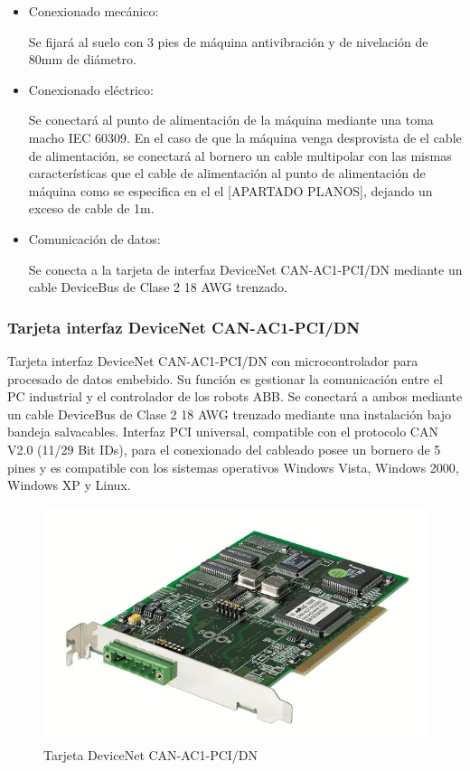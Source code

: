 		\begin{itemize}
				\item{Conexionado mecánico:}
				
				Se fijará al suelo con 3 pies de máquina antivibración y de nivelación de 80mm de diámetro.

				\item{Conexionado eléctrico:}

				Se conectará al punto de alimentación de la máquina mediante una  toma macho IEC 60309. En el caso de que la máquina venga desprovista de el cable de alimentación, se conectará al bornero un cable multipolar con las mismas características que el cable de alimentación al punto de alimentación de máquina como se especifica en el el [APARTADO PLANOS], dejando un exceso de cable de 1m. \	
							
				\item{Comunicación de datos:}

				Se conecta a la tarjeta de interfaz DeviceNet CAN-AC1-PCI/DN mediante un cable DeviceBus de Clase 2 18 AWG trenzado.
		\end{itemize}
\newpage

	\subsubsection{Tarjeta interfaz DeviceNet CAN-AC1-PCI/DN}

	
		Tarjeta interfaz DeviceNet CAN-AC1-PCI/DN con microcontrolador para procesado de datos embebido. Su función es gestionar la comunicación entre el PC industrial y el controlador de los robots ABB. Se conectará a ambos mediante un cable DeviceBus de Clase 2 18 AWG trenzado mediante una instalación bajo bandeja salvacables. Interfaz PCI universal, compatible con el protocolo CAN V2.0 (11/29 Bit IDs), para el conexionado del cableado posee un bornero de 5 pines y es  compatible con los sistemas operativos Windows Vista, Windows 2000, Windows XP y Linux.\\

		\begin{figure}[htp]
			\centering
			\includegraphics[width=1\textwidth]{Datasheets/10aFoto.jpg}
			\caption{Tarjeta DeviceNet CAN-AC1-PCI/DN}
			\label{fig:testa}
	\end{figure}


